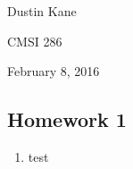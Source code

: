 \documentclass[a4paper,12pt]{article}
\begin{document}
Dustin Kane

CMSI 286

February 8, 2016

\begin{center}
\section*{Homework 1}
\end{center}

\begin{enumerate}
    \item test
\end{enumerate}
\end{document}
